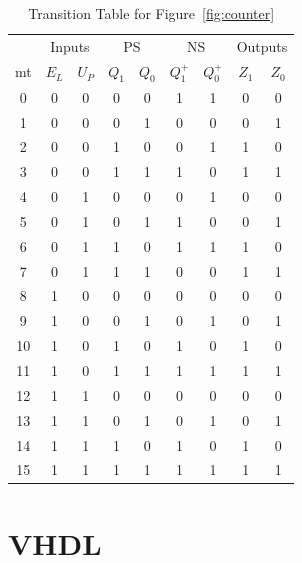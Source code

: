 \documentclass{report}
\begin{document}
\begin{table}[hbtp]
  \centering
  \begin{tabular}{c|cc|cc|cc|cc}
 & \multicolumn{2}{c|}{Inputs} & \multicolumn{2}{c|}{PS} & \multicolumn{2}{c|}{NS} & \multicolumn{2}{c}{Outputs} \\
mt & $E_L$ & $U_P$ & $Q_1$ & $Q_0$ & $Q_1^+$ & $Q_0^+$ & $Z_1$ & $Z_0$ \\
\hline
0  & 0    & 0    & 0     & 0     & 1       & 1       & 0     & 0     \\
1  & 0    & 0    & 0     & 1     & 0       & 0       & 0     & 1     \\
2  & 0    & 0    & 1     & 0     & 0       & 1       & 1     & 0     \\
3  & 0    & 0    & 1     & 1     & 1       & 0       & 1     & 1     \\
4  & 0    & 1    & 0     & 0     & 0       & 1       & 0     & 0     \\
5  & 0    & 1    & 0     & 1     & 1       & 0       & 0     & 1     \\
6  & 0    & 1    & 1     & 0     & 1       & 1       & 1     & 0     \\
7  & 0    & 1    & 1     & 1     & 0       & 0       & 1     & 1     \\
8  & 1    & 0    & 0     & 0     & 0       & 0       & 0     & 0     \\
9  & 1    & 0    & 0     & 1     & 0       & 1       & 0     & 1     \\
10 & 1    & 0    & 1     & 0     & 1       & 0       & 1     & 0     \\
11 & 1    & 0    & 1     & 1     & 1       & 1       & 1     & 1     \\
12 & 1    & 1    & 0     & 0     & 0       & 0       & 0     & 0     \\
13 & 1    & 1    & 0     & 1     & 0       & 1       & 0     & 1     \\
14 & 1    & 1    & 1     & 0     & 1       & 0       & 1     & 0     \\
15 & 1    & 1    & 1     & 1     & 1       & 1       & 1     & 1     \\
\end{tabular}
  \caption{\label{tab:trans} Transition Table for Figure~\ref{fig:counter}}
\end{table}



\section*{VHDL}
\label{sec:vhdl}
\end{document}
